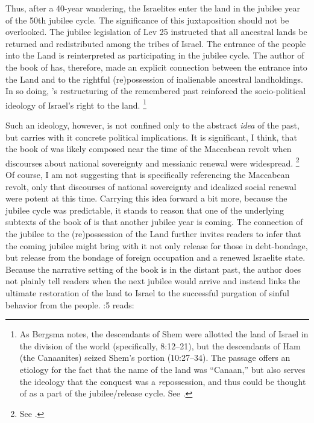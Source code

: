 \noindent
Thus, after a 40-year wandering, the Israelites enter the land in the jubilee year of the 50th jubilee cycle. The significance of this juxtaposition should not be overlooked. The jubilee legislation of Lev 25 instructed that all ancestral lands be returned and redistributed among the tribes of Israel. The entrance of the people into the Land is reinterpreted as participating in the jubilee cycle. The author of the book of \jub has, therefore, made an explicit connection between the entrance into the Land and to the rightful (re)possession of inalienable ancestral landholdings. In so doing, \jub's restructuring of the remembered past reinforced the socio-political ideology of Israel's right to the land.%
    \footnote{%
        As Bergsma notes, the descendants of Shem were allotted the land of Israel in the division of the world (specifically, 8:12--21), but the descendants of Ham (the Canaanites) seized Shem's portion (10:27--34). The passage offers an etiology for the fact that the name of the land was ``Canaan,'' but also serves the ideology that the conquest was a \emph{re}possession, and thus could be thought of as a part of the jubilee/release cycle. See 
        \cite[234--35]{bergsma2007}.}

Such an ideology, however, is not confined only to the abstract \emph{idea} of the past, but carries with it concrete political implications. It is significant, I think, that the book of \jub was likely composed near the time of the Maccabean revolt when discourses about national sovereignty and messianic renewal were widespread.%
    \footnote{%
        See \cite[31--38]{vanderkam2018}.}
Of course, I am not suggesting that \jub is specifically referencing the Maccabean revolt, only that discourses of national sovereignty and idealized social renewal were potent at this time. Carrying this idea forward a bit more, because the jubilee cycle was predictable, it stands to reason that one of the underlying subtexts of the book of \jub is that another jubilee year is coming. The connection of the jubilee to the (re)possession of the Land further invites readers to infer that the coming jubilee might bring with it not only release for those in debt-bondage, but release from the bondage of foreign occupation and a renewed Israelite state. Because the narrative setting of the book is in the distant past, the author does not plainly tell readers when the next jubilee would arrive and instead links the ultimate restoration of the land to Israel to the successful purgation of sinful behavior from the people. :5 reads:

